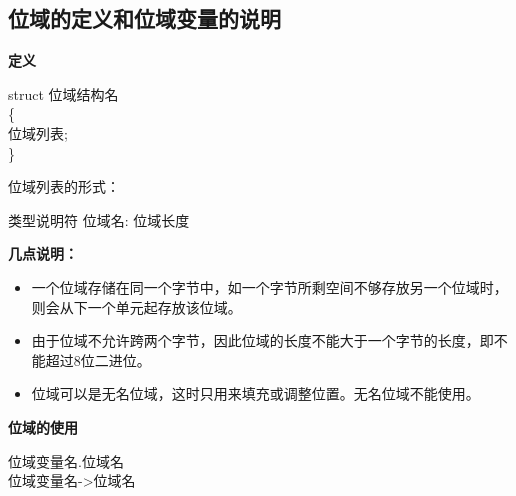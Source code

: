 \documentclass[UTF8]{ctexart}
\begin{document}
			\subsection{位域的定义和位域变量的说明}
			\textbf{定义}
			\begin{framed}
				struct 位域结构名\\
				\{\\
					位域列表;\\
				\}\\
			\end{framed}
			位域列表的形式：\begin{framed}
				类型说明符 位域名: 位域长度
			\end{framed}
			\textbf{几点说明：}
			\begin{itemize}
				\item 一个位域存储在同一个字节中，如一个字节所剩空间不够存放另一个位域时，则会从下一个单元起存放该位域。
				\item 由于位域不允许跨两个字节，因此位域的长度不能大于一个字节的长度，即不能超过8位二进位。
				\item 位域可以是无名位域，这时只用来填充或调整位置。无名位域不能使用。
			\end{itemize}
			\textbf{位域的使用}
			\begin{framed}
				位域变量名.位域名\\
				位域变量名->位域名
			\end{framed}
\end{document}

